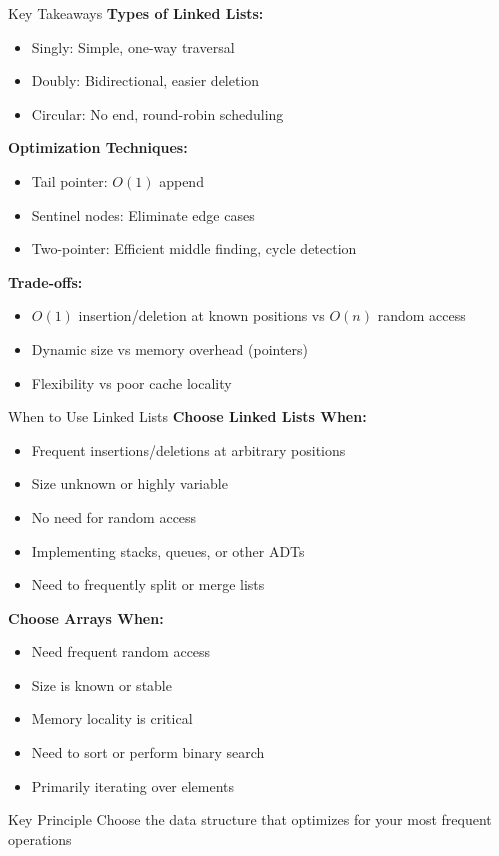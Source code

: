 \documentclass[aspectratio=169,xcolor=dvipsnames]{beamer}
\begin{document}
\begin{frame}{Key Takeaways}
  \textbf{Types of Linked Lists:}
  \begin{itemize}
    \item Singly: Simple, one-way traversal
    \item Doubly: Bidirectional, easier deletion
    \item Circular: No end, round-robin scheduling
  \end{itemize}

  \vspace{0.3cm}
  \textbf{Optimization Techniques:}
  \begin{itemize}
    \item Tail pointer: $O(1)$ append
    \item Sentinel nodes: Eliminate edge cases
    \item Two-pointer: Efficient middle finding, cycle detection
  \end{itemize}

  \vspace{0.3cm}
  \textbf{Trade-offs:}
  \begin{itemize}
    \item $O(1)$ insertion/deletion at known positions vs $O(n)$ random access
    \item Dynamic size vs memory overhead (pointers)
    \item Flexibility vs poor cache locality
  \end{itemize}
\end{frame}

\begin{frame}{When to Use Linked Lists}
  \textbf{Choose Linked Lists When:}
  \begin{itemize}
    \item Frequent insertions/deletions at arbitrary positions
    \item Size unknown or highly variable
    \item No need for random access
    \item Implementing stacks, queues, or other ADTs
    \item Need to frequently split or merge lists
  \end{itemize}

  \vspace{0.3cm}
  \textbf{Choose Arrays When:}
  \begin{itemize}
    \item Need frequent random access
    \item Size is known or stable
    \item Memory locality is critical
    \item Need to sort or perform binary search
    \item Primarily iterating over elements
  \end{itemize}

  \vspace{0.3cm}
  \begin{alertblock}{Key Principle}
    Choose the data structure that optimizes for your most frequent operations
  \end{alertblock}
\end{frame}
\end{document}
